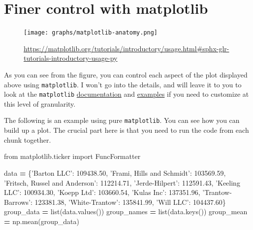 \documentclass[
  letterpaper,
]{scrbook}
\newenvironment{Shaded}{\begin{snugshade}}{\end{snugshade}}
\newcommand{\BuiltInTok}[1]{#1}
\newcommand{\FloatTok}[1]{\textcolor[rgb]{0.00,0.00,0.81}{#1}}
\newcommand{\ImportTok}[1]{#1}
\newcommand{\NormalTok}[1]{#1}
\newcommand{\OperatorTok}[1]{\textcolor[rgb]{0.81,0.36,0.00}{\textbf{#1}}}
\newcommand{\StringTok}[1]{\textcolor[rgb]{0.31,0.60,0.02}{#1}}
\begin{document}
\hypertarget{finer-control-with-matplotlib}{%
\section{Finer control with matplotlib}\label{finer-control-with-matplotlib}}

\begin{figure}
\centering
\texttt{[image: graphs/matplotlib-anatomy.png]}
\caption{\url{https://matplotlib.org/tutorials/introductory/usage.html\#sphx-glr-tutorials-introductory-usage-py}}
\end{figure}

As you can see from the figure, you can control each aspect of the plot displayed above using \texttt{matplotlib}. I won't go into the details, and will leave it to you to look at the \texttt{matplotlib} \href{https://matplotlib.org/contents.html}{documentation} and \href{https://matplotlib.org/gallery/index.html}{examples} if you need to customize at this level of granularity.

The following is an example using pure \texttt{matplotlib}. You can see how you can build up a plot. The crucial part here is that you need to run the code from each chunk together.

\begin{Shaded}
\begin{Highlighting}[]
\ImportTok{from}\NormalTok{ matplotlib.ticker }\ImportTok{import}\NormalTok{ FuncFormatter}

\NormalTok{data }\OperatorTok{=}\NormalTok{ \{}\StringTok{'Barton LLC'}\NormalTok{: }\FloatTok{109438.50}\NormalTok{,}
        \StringTok{'Frami, Hills and Schmidt'}\NormalTok{: }\FloatTok{103569.59}\NormalTok{,}
        \StringTok{'Fritsch, Russel and Anderson'}\NormalTok{: }\FloatTok{112214.71}\NormalTok{,}
        \StringTok{'Jerde-Hilpert'}\NormalTok{: }\FloatTok{112591.43}\NormalTok{,}
        \StringTok{'Keeling LLC'}\NormalTok{: }\FloatTok{100934.30}\NormalTok{,}
        \StringTok{'Koepp Ltd'}\NormalTok{: }\FloatTok{103660.54}\NormalTok{,}
        \StringTok{'Kulas Inc'}\NormalTok{: }\FloatTok{137351.96}\NormalTok{,}
        \StringTok{'Trantow-Barrows'}\NormalTok{: }\FloatTok{123381.38}\NormalTok{,}
        \StringTok{'White-Trantow'}\NormalTok{: }\FloatTok{135841.99}\NormalTok{,}
        \StringTok{'Will LLC'}\NormalTok{: }\FloatTok{104437.60}\NormalTok{\}}
\NormalTok{group_data }\OperatorTok{=} \BuiltInTok{list}\NormalTok{(data.values())}
\NormalTok{group_names }\OperatorTok{=} \BuiltInTok{list}\NormalTok{(data.keys())}
\NormalTok{group_mean }\OperatorTok{=}\NormalTok{ np.mean(group_data)}
\end{Highlighting}
\end{Shaded}
\end{document}
